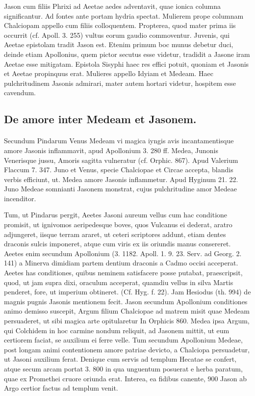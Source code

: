 \documentclass[a4paper, 11pt, oneside, polutonikogreek, german]{article}
\begin{document}
Jason cum filiis Phrixi ad Aeetae aedes adventavit, quae ionica columna significantur. Ad fontes ante portam hydria spectat. Mulierem prope columnam Chalciopam appello cum filiis colloquentem. Propterea, quod mater prima iis occurrit (cf. Apoll. 3. 255) vultus eorum gaudio commoventur. Juvenis, qui Aeetae epistolam tradit Jason est. Etenim primum boc munus debetur duci, deinde etiam Apollonius, quem pictor secutus esse videtur, tradidit a Jasone iram Aeetae esse mitigatam. Epistola Sisyphi haec res effici potuit, quoniam et Jasonis et Aeetae propinquus erat. Mulieres appello Idyiam et Medeam. Haec pulchritudinem Jasonis admirari, mater autem hortari videtur, hospitem esse cavendum.

\subsection{De amore inter Medeam et Jasonem.}
\paragraph{}
Secundum Pindarum Venus Medeam vi magica iyngis avis incantamentisque amore Jasonis inflammavit, apud Apollonium 3. 280 ff. Medea, Junonis Venerisque jussu, Amoris sagitta vulneratur (cf. Orphic. 867). Apud Valerium Flaccum 7. 347. Juno et Venus, specie Chalciopae et Circae accepta, blandis verbis efficiunt, ut. Medea amore Jasonis inflammetur. Apud Hyginum 21. 22. Juno Medeae somnianti Jasonem monstrat, cujus pulchritudine amor Medeae incenditor.

Tum, ut Pindarus pergit, Aeetes Jasoni aureum vellus cum hac conditione promisit, ut ignivomos aeripedesque boves, quos Vulcanus ei dederat, aratro adjungeret, iisque terram araret, ut ceteri scriptores addunt, etiam dentes draconis sulcis imponeret, atque cum viris ex iis oriundis manus consereret. Aeetes enim secundum Apollonium (3. 1182. Apoll. 1. 9. 23. Serv. ad Georg. 2. 141) a Minerva dimidiam partem dentium draconis a Cadmo occisi acceperat. Aeetes has conditiones, quibus neminem satisfacere posse putabat, praescripsit, quod, ut jam supra dixi, oraculum acceperat, quamdiu vellus in silva Martis penderet, fore, ut imperium obtineret. (Cf. Hyg. f. 22). Jam Hesiodus (th. 994) de magnis pugnis Jasonis mentionem fecit. Jason secundum Apollonium conditiones animo demisso suscepit, Argum filium Chalciopae ad matrem misit quae Medeam persuaderet, ut sibi magica arte opitularetur In Orphicis 860. Medea ipsa Argum, qui Colchidem in hoc carmine nondum reliquit, ad Jasonem mittit, ut eum certiorem faciat, se auxilium ei ferre velle. Tum secundum Apollonium Medeae, post longam animi contentionem amore patriae devicto, a Chalciopa persuadetur, ut Jasoni auxilium ferat. Denique cum servis ad templum Hecatae se confert, atque secum arcam portat 3. 800 in qua unguentum posuerat e herba paratum, quae ex Promethei cruore oriunda erat. Interea, ea fidibus canente, 900 Jason ab Argo certior factus ad templum venit.
\end{document}
